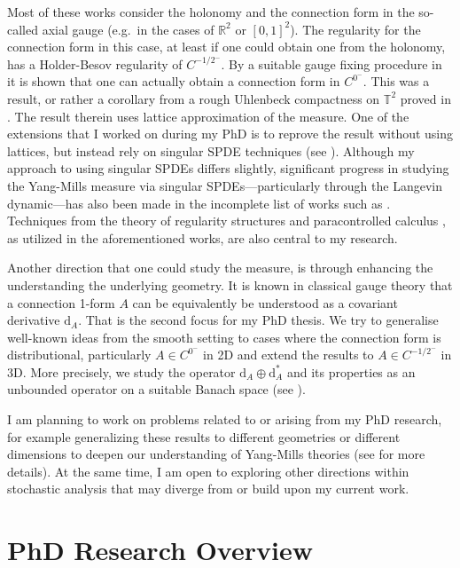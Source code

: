 \documentclass[11pt]{article}
\numberwithin{equation}{section}
\theoremstyle{definition}
\theoremstyle{remark}
\newcommand{\diff}{\mathrm{d}}
\newcommand{\R}{\mathbb R}
\newcommand{\1}{\mathbf 1}
\newcommand{\<}{\langle}
\renewcommand{\>}{\rangle}
\newcommand{\bT}{\mathbb T}
\begin{document}
Most of these works consider the holonomy and the connection form in the so-called axial gauge (e.g.\ in the cases of $\R^2$ or $[0,1]^2$). The regularity for the connection form in this case, at least if one could obtain one from the holonomy, has a Holder-Besov regularity of $C^{-1/2^-}$. By a suitable gauge fixing procedure in \cite{Chevyrev19} it is shown that one can actually obtain a connection form in $C^{0^-}$. This was a result, or rather a corollary from a rough Uhlenbeck compactness on $\bT^2$ proved in \cite{Chevyrev19}. The result therein uses lattice approximation of the measure. One of the extensions that I worked on during my PhD  is to reprove the result without using lattices, but instead rely on singular SPDE techniques (see  ). Although my approach to using singular SPDEs differs slightly, significant progress in studying the Yang-Mills measure via singular SPDEs—particularly through the Langevin dynamic—has also been made in the incomplete list of works such as  \cite{CCHS2d,CCHS3d,CH23,BC23,BC24}. Techniques from the theory of regularity structures \cite{Hairer14} and paracontrolled calculus \cite{GIP15}, as utilized in the aforementioned works, are also central to my research. 



Another direction that one could study the measure, is through enhancing the understanding the underlying geometry. It is known in classical gauge theory that a connection 1-form $A$ can be equivalently be understood as a covariant derivative $\diff_A$. That is the second focus for my PhD thesis. We try to generalise well-known ideas from the smooth setting to cases where the connection form is distributional, particularly $A\in C^{0^-}$ in 2D and extend the results to $A\in C^{-1/2^-}$ in 3D. More precisely, we study the operator $\diff_A\oplus\diff_A^*$ and its properties as an unbounded operator on a suitable Banach space (see ). 

I am planning to work on problems related to or arising from my PhD research, for example generalizing these results to different geometries or different dimensions to deepen our understanding of Yang-Mills theories (see  for more details).  At the same time, I am open to exploring other directions within stochastic analysis that may diverge from or build upon my current work.

\section{PhD Research Overview}
\end{document}
